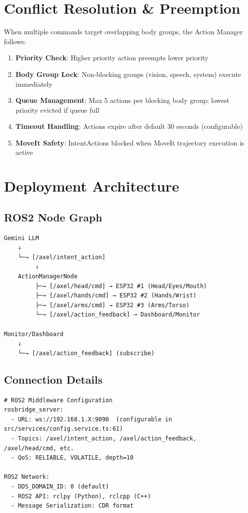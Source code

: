 \documentclass{article}
\begin{document}
\section{Conflict Resolution & Preemption}

When multiple commands target overlapping body groups, the Action Manager follows:

\begin{enumerate}
    \item \textbf{Priority Check}: Higher priority action preempts lower priority
    \item \textbf{Body Group Lock}: Non-blocking groups (vision, speech, system) execute immediately
    \item \textbf{Queue Management}: Max 5 actions per blocking body group; lowest priority evicted if queue full
    \item \textbf{Timeout Handling}: Actions expire after default 30 seconds (configurable)
    \item \textbf{MoveIt Safety}: IntentActions blocked when MoveIt trajectory execution is active
\end{enumerate}

\section{Deployment Architecture}

\subsection{ROS2 Node Graph}

\begin{lstlisting}
Gemini LLM
    ↓
    └─→ [/axel/intent_action] 
         ↓
    ActionManagerNode
         ├─→ [/axel/head/cmd] → ESP32 #1 (Head/Eyes/Mouth)
         ├─→ [/axel/hands/cmd] → ESP32 #2 (Hands/Wrist)
         ├─→ [/axel/arms/cmd] → ESP32 #3 (Arms/Torso)
         └─→ [/axel/action_feedback] → Dashboard/Monitor

Monitor/Dashboard
    ↓
    └─→ [/axel/action_feedback] (subscribe)
\end{lstlisting}

\subsection{Connection Details}

\begin{lstlisting}
# ROS2 Middleware Configuration
rosbridge_server:
  - URL: ws://192.168.1.X:9090  (configurable in src/services/config.service.ts:61)
  - Topics: /axel/intent_action, /axel/action_feedback, /axel/head/cmd, etc.
  - QoS: RELIABLE, VOLATILE, depth=10

ROS2 Network:
  - DDS_DOMAIN_ID: 0 (default)
  - ROS2 API: rclpy (Python), rclcpp (C++)
  - Message Serialization: CDR format
\end{lstlisting}
\end{document}
